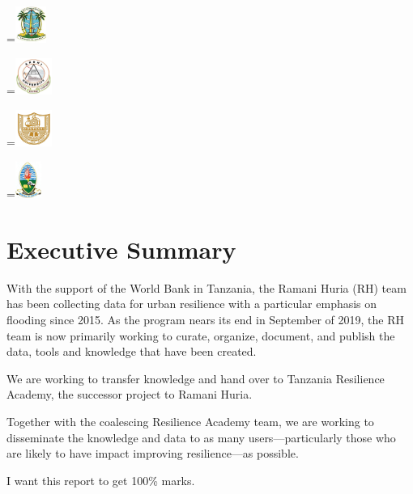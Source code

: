 \documentclass[a4paper,12pt,twoside]{article}
\newcommand*{\vcenteredhbox}[1]{\begingroup
\setbox0=\hbox{#1}\parbox{\wd0}{\box0}\endgroup} %
\begin{document}
\medskip

\vcenteredhbox{\includegraphics[height=1.2cm]{images/logo_dar-es-salaam.jpg}}
\vcenteredhbox{\includegraphics[height=1.2cm]{images/logo_Ardhi.png}}
\vcenteredhbox{\includegraphics[height=1.2cm]{images/logo_costech.png}}
\vcenteredhbox{\includegraphics[height=1.2cm]{images/logo_UDSM.jpg}}

\newpage

\tableofcontents

\newpage
\section{Executive Summary}
\label{executivesummary}
\begin{multicols}{2}

  \begin{mdframed}[hidealllines=true,backgroundcolor=RHgreen!10,innerleftmargin=6pt,innerrightmargin=6pt,leftmargin=-3pt,rightmargin=-3pt]

\color{RHgrey}
    
With the support of the World Bank in Tanzania, the Ramani Huria (RH) team has been collecting data for urban resilience with a particular emphasis on flooding since 2015. As the program nears its end in September of 2019, the RH team is now primarily working to curate, organize, document, and publish the data, tools and knowledge that have been created. 

We are working to transfer knowledge and hand over to Tanzania Resilience Academy, the successor project to Ramani Huria. 
\end{mdframed}

Together with the coalescing Resilience Academy team, we are working to disseminate the knowledge and data to as many users---particularly those who are likely to have impact improving resilience---as possible. 

I want this report to get 100\% marks.

\lipsum[10-18]

\end{multicols}
\end{document}
